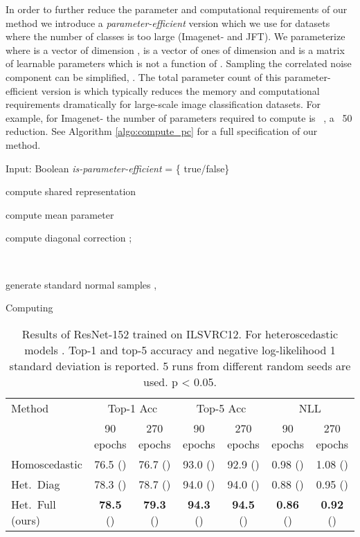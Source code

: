 \documentclass[final]{cvpr}
\begin{document}
In order to further reduce the parameter and computational requirements of our method we introduce a \emph{parameter-efficient} version which we use for datasets where the number of classes is too large (Imagenet- and JFT). We parameterize  where  is a vector of dimension ,  is a vector of ones of dimension  and  is a  matrix of learnable parameters which is not a function of . Sampling the correlated noise component can be simplified, . The total parameter count of this parameter-efficient version is  which typically reduces the memory and computational requirements dramatically for large-scale image classification datasets. For example, for Imagenet- the number of parameters required to compute  is ~, a ~50 reduction. See Algorithm \ref{algo:compute_pc} for a full specification of our method.

\begin{algorithm}[t]
\SetAlgoLined
Input: Boolean \textit{is-parameter-efficient} = \{ true/false\}\;

 compute shared representation \;
 
 compute mean parameter \;
 
 compute diagonal correction ;
 
 \
 
 generate  standard normal samples , \;

  
  
 \caption{Computing }
 \label{algo:compute_pc}
\end{algorithm}

\begin{table*}[tbh]
\centering
\begin{tabular}{lcccccc}
\toprule
Method & \multicolumn{2}{c}{Top-1 Acc} & \multicolumn{2}{c}{Top-5 Acc} & \multicolumn{2}{c}{NLL} \\
& 90 epochs & 270 epochs & 90 epochs & 270 epochs & 90 epochs & 270 epochs \\
\midrule
Homoscedastic & 76.5 () & 76.7 () & 93.0 () & 92.9 () & 0.98 () & 1.08 () \\
Het.\ Diag~\cite{collier2020analysis} & 78.3 () & 78.7   () & 94.0 () & 94.0 () & 0.88 () & 0.95 ()\\ 
Het.\ Full (ours) & \textbf{78.5} () & \textbf{79.3}  () & \textbf{94.3} () & \textbf{94.5} () & \textbf{0.86} () & \textbf{0.92} ()\\ 
\bottomrule
\end{tabular}
\caption{Results of ResNet-152 trained on ILSVRC12. For heteroscedastic models . Top-1 and top-5 accuracy and negative log-likelihood  1 standard deviation is reported. 5 runs from different random seeds are used.  p < 0.05.} 
\label{table:het_vs_hom_imagenet}
\end{table*}
\end{document}
